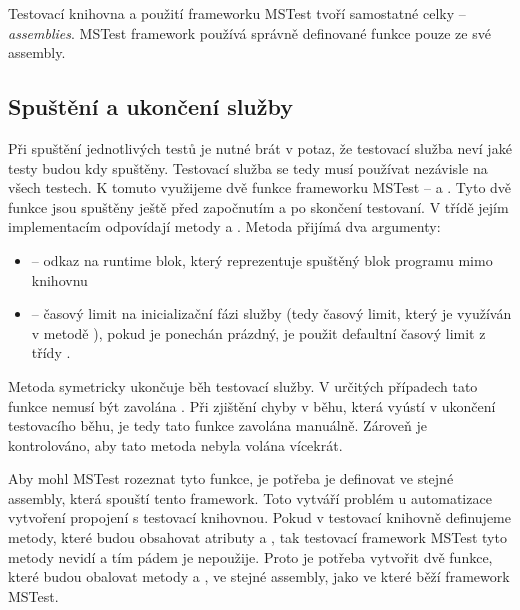 Testovací knihovna a použití frameworku MSTest tvoří samostatné celky -- \textit{assemblies}. MSTest framework používá správně definované funkce pouze ze své assembly. 


\subsection{Spuštění a ukončení služby}

Při spuštění jednotlivých testů je nutné brát v potaz, že testovací služba neví jaké testy budou kdy spuštěny. Testovací služba se tedy musí používat nezávisle na všech testech. K tomuto využijeme dvě funkce frameworku MSTest --  a . Tyto dvě funkce jsou spuštěny ještě před započnutím a po skončení testovaní. V třídě  jejím implementacím odpovídají metody  a . Metoda  přijímá dva argumenty:

\begin{itemize}
    \item {} -- odkaz na runtime blok, který reprezentuje spuštěný blok programu mimo knihovnu
    \item {} -- časový limit na inicializační fázi služby (tedy časový limit, který je využíván v metodě ), pokud je ponechán prázdný, je použit defaultní časový limit z třídy .
\end{itemize}

Metoda  symetricky ukončuje běh testovací služby. V určitých případech tato funkce nemusí být zavolána . Při zjištění chyby v běhu, která vyústí v ukončení testovacího běhu, je tedy tato funkce zavolána manuálně. Zároveň je kontrolováno, aby tato metoda nebyla volána vícekrát.

Aby mohl MSTest rozeznat tyto funkce, je potřeba je definovat ve stejné assembly, která spouští tento framework. Toto vytváří problém u automatizace vytvoření propojení s testovací knihovnou. Pokud v testovací knihovně definujeme metody, které budou obsahovat atributy  a , tak testovací framework  MSTest tyto metody nevidí a tím pádem je nepoužije. Proto je potřeba vytvořit dvě funkce, které budou obalovat metody  a , ve stejné assembly, jako ve které běží framework MSTest.

